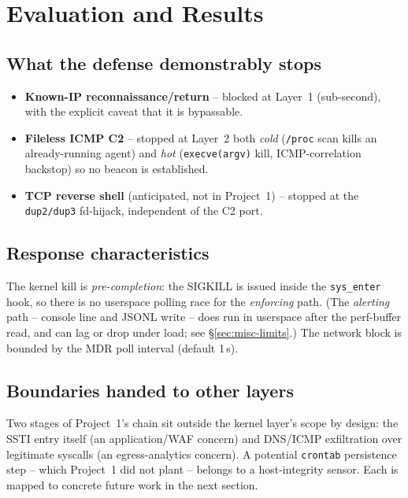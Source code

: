 \documentclass[11pt]{article}
\newcommand{\co}[1]{\texttt{#1}}
\begin{document}
\section{Evaluation and Results}

\subsection{What the defense demonstrably stops}
\begin{itemize}[leftmargin=1.4em]
  \item \textbf{Known-IP reconnaissance/return} -- blocked at Layer~1
        (sub-second), with the explicit caveat that it is bypassable.
  \item \textbf{Fileless ICMP C2} -- stopped at Layer~2 both \emph{cold}
        (\co{/proc} scan kills an already-running agent) and \emph{hot}
        (\co{execve(argv)} kill, ICMP-correlation backstop) so no beacon is
        established.
  \item \textbf{TCP reverse shell} (anticipated, not in Project~1) --
        stopped at the \co{dup2/dup3} fd-hijack, independent of the C2 port.
\end{itemize}

\subsection{Response characteristics}
The kernel kill is \emph{pre-completion}: the SIGKILL is issued inside the
\co{sys\_enter} hook, so there is no userspace polling race for the
\emph{enforcing} path. (The \emph{alerting} path -- console line and JSONL
write -- does run in userspace after the perf-buffer read, and can lag or
drop under load; see \S\ref{sec:misc-limits}.) The network block is bounded
by the MDR poll interval (default 1\,s).

\subsection{Boundaries handed to other layers}
Two stages of Project~1's chain sit outside the kernel layer's scope by
design: the SSTI entry itself (an application/WAF concern) and DNS/ICMP
exfiltration over legitimate syscalls (an egress-analytics concern). A
potential \co{crontab} persistence step -- which Project~1 did not plant --
belongs to a host-integrity sensor. Each is mapped to concrete future work
in the next section.
\end{document}
